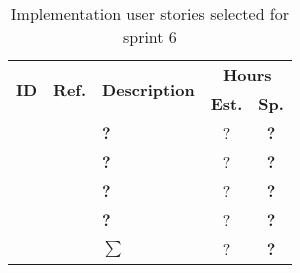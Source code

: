 \begin{table*}%
 \def\arraystretch{1.25}
 \caption{Implementation user stories selected for sprint 6}
   \label{tab:sprint6stories}
 
\begin{tabularx}{\textwidth}{ccXcc}

\toprule[0.5mm]
\multirow{2}{*}{\textbf{ID}} &
\multirow{2}{*}{\textbf{Ref.}} & \multirow{2}{*}{\textbf{Description}} & \multicolumn{2}{c}{\textbf{Hours}} \\
 					& & & \textbf{Est.} & \textbf{Sp.} \\
\midrule
\textbf{} 	& {?}	& {\bf ?}			& ?	& \textbf{?} \\

\textbf{} 	& {?}	& {\bf ?}			& ?	& \textbf{?} \\

\textbf{} 	& {?}	& {\bf ?} 			& ?	& \textbf{?} \\	

\textbf{} 	& {?}	& {\bf ?} 			& ?	& \textbf{?} \\
	
\midrule
		
				&& \textbf{$\sum$}		&	?	& \textbf{?}
 \\																			
\bottomrule[0.5mm]
\end{tabularx}
\end{table*}